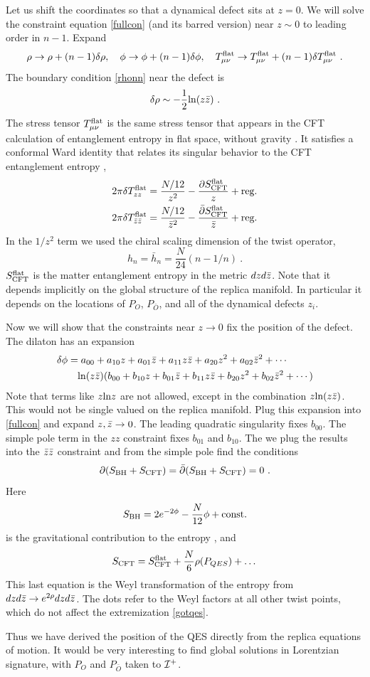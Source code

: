 \documentclass[12pt,oneside,letterpaper]{article}
\newcommand{\p}{\partial}
\newcommand{\be}{\begin{equation}}
\newcommand{\ee}{\end{equation}}
\def\be{\begin{eqnarray}}
\def\ee{\end{eqnarray}}
\def\be{\begin{equation}}
\def\ee{\end{equation}}
\def\log{{\rm ln}}
\renewcommand{\p}{\partial}
\numberwithin{equation}{section}
\def \be {\begin{equation}}
\def \ee {\end{equation}}
\begin{document}
Let us shift the coordinates so that a dynamical defect sits at $z=0$. We will solve the constraint equation \eqref{fullcon} (and its barred version) near $z\sim 0$ to leading order in $n-1$. Expand
\be
\rho \to \rho + (n-1)\delta \rho , \quad
\phi \to \phi + (n-1)\delta \phi , \quad
T_{\mu\nu}^{\rm flat} \to T_{\mu\nu}^{\rm flat} + (n-1)\delta T_{\mu\nu}^{\rm flat} \ .
\ee
The boundary condition \eqref{rhonn} near the defect is
\be\label{rhobc}
\delta \rho \sim -\frac{1}{2}\log (z\bz ) \ .
\ee
The stress tensor $T^{\rm flat}_{\mu\nu}$ is the same stress tensor that appears in the CFT calculation of entanglement entropy in flat space, without gravity \cite{Holzhey:1994we,Calabrese:2004eu}. It satisfies a conformal Ward identity that relates its singular behavior to the CFT entanglement entropy \cite{Calabrese:2004eu},
\begin{align}
2\pi \delta T_{zz}^{\rm flat} &= \frac{N/12}{z^2} - \frac{\p S_{\rm CFT}^{\rm flat}}{z} + \mbox{reg.} \\
2\pi \delta T_{\bz \bz}^{\rm flat} &= \frac{N/12}{\bz^2} - \frac{ \bar{\p} S_{\rm CFT}^{\rm flat}}{\bz} + \mbox{reg.}
\end{align}
In the $1/z^2$ term we used the chiral scaling dimension of the twist operator,
\be
h_n = \bar{h}_n = \frac{N}{24}(n-1/n) \ .
\ee
$S_{\rm CFT}^{\rm flat}$ is the matter entanglement entropy in the metric $dz d\bar{z}$.  Note that it depends implicitly on the global structure of the replica manifold. In particular it depends on the locations of $P_O$, $P_{\bar{O}}$, and all of the  dynamical defects $z_i$.

Now we will show that the constraints near $z \to 0$ fix the position of the defect. The dilaton has an expansion
\begin{align}
\delta \phi &= a_{00} + a_{10}z + a_{01} \bz + a_{11}z \bz + a_{20} z^2 + a_{02} \bz^2 +  \cdots\\
&\quad \log(z\bz)(b_{00} + b_{10}z + b_{01} \bz + b_{11}z \bz + b_{20} z^2 + b_{02} \bz^2 +  \cdots) \notag
\end{align}
Note that terms like $z \log z$ are not allowed, except in the combination $z \log (z \bz)$. This would not be single valued on the replica manifold. Plug this expansion into \eqref{fullcon} and expand $z,\bar{z} \to 0$. The leading quadratic singularity fixes $b_{00}$. The simple pole term in the $zz$ constraint fixes $b_{01}$ and $b_{10}$. The we plug the results into the $\bar{z} \bar{z}$ constraint and from the simple pole find the conditions
\be\label{gotqes}
\p( S_{\rm BH} + S_{\rm CFT} ) = \bar{\p} (S_{\rm BH} + S_{\rm CFT}) = 0 \ .
\ee
Here
\be
S_{\rm BH} = 2e^{-2\phi} - \frac{N}{12} \phi + \mbox{const}. 
\ee
is the gravitational contribution to the entropy \cite{Fiola:1994ir,Myers:1994sg}, 
and
\be
S_{\rm CFT} = S_{\rm CFT}^{\rm flat} + \frac{N}{6}\rho(P_{QES}) + \dots \,
\ee
This last equation is the Weyl transformation of the entropy from $dz d\bar{z} \to e^{2\rho} dz d\bar{z}$. The dots refer to the Weyl factors at all other twist points, which do not affect the extremization \eqref{gotqes}. 

Thus we have derived the position of the QES directly from the replica equations of motion. It would be very interesting to find global solutions in Lorentzian signature, with $P_O$ and $P_{\bar{O}}$ taken to ${\cal I}^+$. 




\small

 
\end{document}
